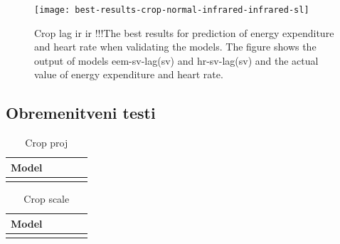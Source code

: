 \begin{figure}[!htbp]
	\centering
	\texttt{[image: best-results-crop-normal-infrared-infrared-sl]}
	\caption{Crop lag ir ir !!!The best results for prediction of energy expenditure and heart rate when validating the models. The figure shows the output of models eem-sv-lag(sv) and hr-sv-lag(sv) and the actual value of energy expenditure and heart rate.}
	\label{fig:crop-lag-rezultat}
\end{figure}










\subsection{Obremenitveni testi}
\begin{table}[!htbp]
	\centering
	\begin{tabular}{l S[table-format=1.2, round-mode=places, round-precision=2] S[table-format=1.2, round-mode=places, round-precision=2] S[table-format=1.2, round-mode=places, round-precision=2] S[table-format=1.2, round-mode=places, round-precision=2]}
		\toprule
		\textbf{Model} &  &  &  &  \\
		\midrule
		\bottomrule
	\end{tabular}
	\caption{Crop proj}
	\label{tab:crop-proj}
\end{table}

\begin{table}[!htbp]
	\centering
	\begin{tabular}{l S[table-format=1.2, round-mode=places, round-precision=2] S[table-format=1.2, round-mode=places, round-precision=2] S[table-format=1.2, round-mode=places, round-precision=2] S[table-format=1.2, round-mode=places, round-precision=2]}
		\toprule
		\textbf{Model} &  &  &  &  \\
		\midrule
		\bottomrule
	\end{tabular}
	\caption{Crop scale}
	\label{tab:crop-scale}
\end{table}










